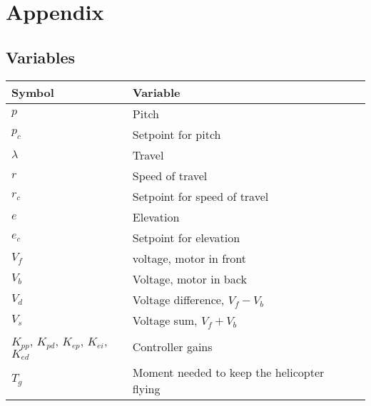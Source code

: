 \section{Appendix}
\subsection{Variables}
\begin{center}
\begin{tabular}{l l l l}
\hline 
Symbol & Variable \\ \hline
$p$ & Pitch \\
$p_c$ & Setpoint for pitch \\
$\lambda$ & Travel \\
$r$ & Speed of travel \\
$r_c$ & Setpoint for speed of travel \\
$e$ & Elevation \\
$e_c$ & Setpoint for elevation \\
$V_f$ & voltage, motor in front \\
$V_b$ & Voltage, motor in back \\
$V_d$ & Voltage difference, $V_f -V_b$ \\
$V_s$ & Voltage sum, $V_f + V_b$ \\
$K_{pp}$, $K_{pd}$, $K_{ep}$, $K_{ei}$, $K_{ed}$ & Controller gains \\
$T_g$ & Moment needed to keep the helicopter flying
\end{tabular}
\end{center}
\label{table:variables}



\vspace{1cm}

